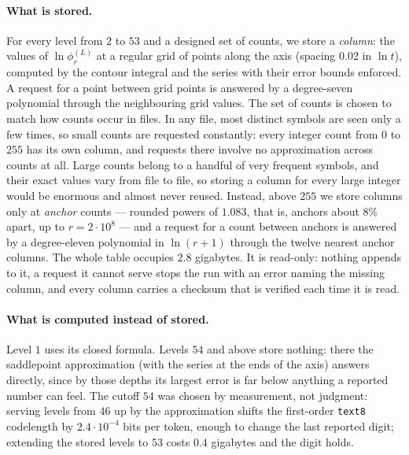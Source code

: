 \documentclass[11pt]{article}
\begin{document}
\paragraph{What is stored.}
For every level from $2$ to $53$ and a designed set of counts, we
store a \emph{column}: the values of $\ln \phi_r^{(L)}$ at a regular
grid of points along the axis (spacing $0.02$ in $\ln t$), computed
by the contour integral and the series with their error bounds
enforced.  A request for a point between grid points is answered by a
degree-seven polynomial through the neighbouring grid values.  The
set of counts is chosen to match how counts occur in files.  In any
file, most distinct symbols are seen only a few times, so small
counts are requested constantly: every integer count from $0$ to
$255$ has its own column, and requests there involve no approximation
across counts at all.  Large counts belong to a handful of very
frequent symbols, and their exact values vary from file to file, so
storing a column for every large integer would be enormous and
almost never reused.  Instead, above $255$ we store columns only at
\emph{anchor} counts --- rounded powers of $1.083$, that is, anchors
about $8\%$ apart, up to $r = 2 \cdot 10^8$ --- and a request for a
count between anchors is answered by a degree-eleven polynomial in
$\ln(r{+}1)$ through the twelve nearest anchor columns.  The whole
table occupies $2.8$ gigabytes.  It is read-only: nothing appends to
it, a request it cannot serve stops the run with an error naming the
missing column, and every column carries a checksum that is verified
each time it is read.

\paragraph{What is computed instead of stored.}
Level $1$ uses its closed formula.  Levels $54$ and above store
nothing: there the saddlepoint approximation (with the series at the
ends of the axis) answers directly, since by those depths its largest
error is far below anything a reported number can feel.  The cutoff
$54$ was chosen by measurement, not judgment: serving levels from
$46$ up by the approximation shifts the first-order \texttt{text8}
codelength by $2.4 \cdot 10^{-4}$ bits per token, enough to change
the last reported digit; extending the stored levels to $53$ costs
$0.4$ gigabytes and the digit holds.
\end{document}
